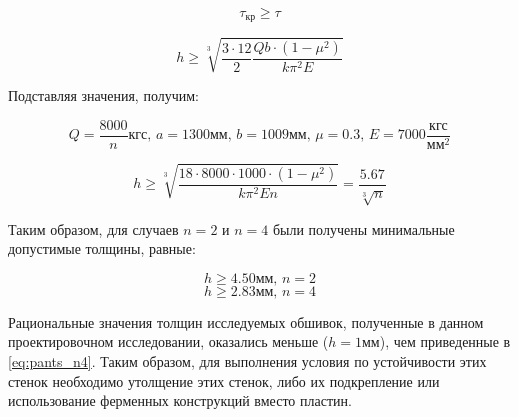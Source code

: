 \begin{equation}
\tau_\text{кр} \geq \tau  
\end{equation}

\begin{equation}
h \geq \sqrt[3]{\frac{3\cdot12}{2}\frac{Qb\cdot(1-\mu^2)}{k\pi^2E}}
\end{equation}

Подставляя значения, получим:

\begin{equation}
Q=\frac{8000}{n}\text{кгс},\,a=1300\text{мм},\,b=1009\text{мм},\,\mu=0.3,\,E=7000\frac{\text{кгс}}{\text{мм}^2}
\end{equation}

\begin{equation}
h \geq \sqrt[3]{\frac{18\cdot8000\cdot1000\cdot(1-\mu^2)}{k\pi^2En}} = \frac{5.67}{\sqrt[3]{n}} 
\end{equation}

Таким образом, для случаев $n = 2$ и $n = 4$  были получены минимальные допустимые толщины, 
равные:

\begin{equation}
h\geq4.50\text{мм},\,n=2
\end{equation}
\begin{equation}
h\geq2.83\text{мм},\,n=4
\label{eq:pants_n4}
\end{equation}

Рациональные значения толщин исследуемых обшивок, полученные в данном проектировочном исследовании, оказались меньше ($h = 1\text{мм}$), чем приведенные в \ref{eq:pants_n4}. Таким образом, для выполнения условия по устойчивости этих стенок необходимо утолщение этих стенок, либо их подкрепление или использование ферменных конструкций вместо пластин.